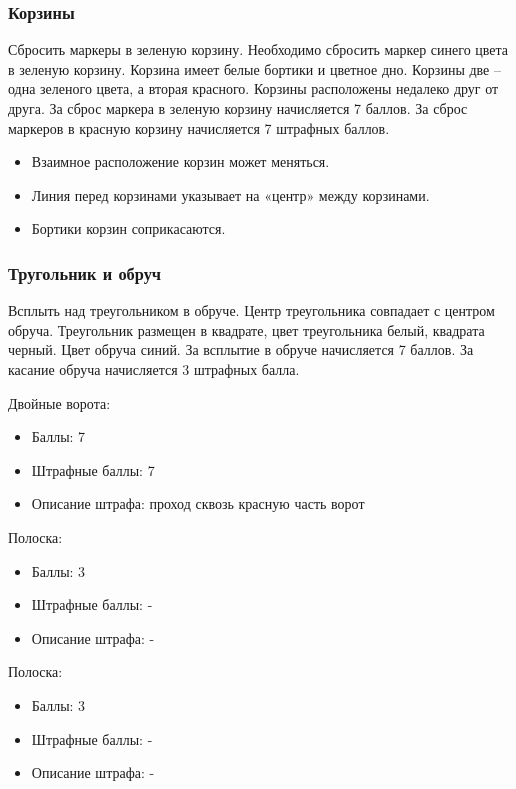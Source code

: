\subsubsection*{Корзины}


Сбросить маркеры в зеленую корзину. Необходимо сбросить маркер синего цвета в зеленую корзину. Корзина имеет белые бортики и цветное дно. Корзины две – одна зеленого цвета, а вторая красного. Корзины расположены недалеко друг от друга. За сброс маркера в зеленую корзину начисляется 7 баллов. За сброс маркеров в красную корзину начисляется 7 штрафных баллов.      

\begin{itemize}
    \item Взаимное расположение корзин может меняться.
    \item Линия перед корзинами указывает на «центр» между корзинами.
    \item Бортики корзин соприкасаются.
\end{itemize}

\subsubsection*{Тругольник и обруч}


Всплыть над треугольником в обруче. Центр треугольника совпадает с центром обруча. Треугольник размещен в квадрате, цвет треугольника белый, квадрата черный. Цвет обруча синий. За всплытие в обруче начисляется 7 баллов. За касание обруча начисляется 3 штрафных балла.

\markSection

Двойные ворота: 
\begin{itemize}
    \item Баллы: 7
    \item Штрафные баллы: 7
    \item Описание штрафа: проход сквозь красную часть ворот
\end{itemize}

Полоска:
\begin{itemize}
    \item Баллы: 3
    \item Штрафные баллы: -
    \item Описание штрафа: -
\end{itemize}

Полоска: 
\begin{itemize}
    \item Баллы: 3
    \item Штрафные баллы: -
    \item Описание штрафа: -
\end{itemize}

